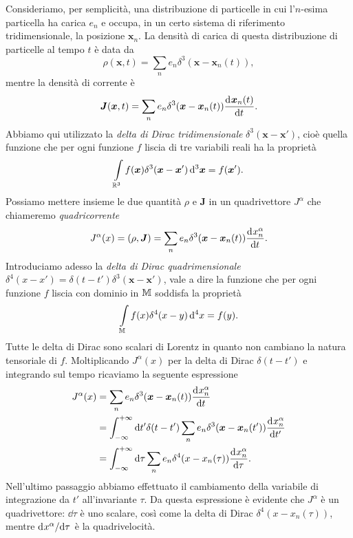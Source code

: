 Consideriamo, per semplicità, una distribuzione di particelle in cui l'$n$-esima
particella ha carica $e_{n}$ e occupa, in un certo sistema di riferimento
tridimensionale, la posizione $\bm{x}_{n}$.  La densità
di carica di questa distribuzione di particelle al tempo $t$ è data da
\begin{equation}
  \rho(\bm{x},t) = \sum_{n} e_{n}\delta^{3}(\bm{x} - \bm{x}_{n}(t)),
\end{equation}
mentre la densità di corrente è
\begin{equation}
  \bm{J}(\bm{x},t) = \sum_{n} e_{n}\delta^{3}(\bm{x} - \bm{x}_{n}(t))
  \frac{{\mathop{}\!\mathrm{d}^{}}\bm{x}_{n}(t)}{\mathop{}\!\mathrm{d} {t}^{}}.
\end{equation}
Abbiamo qui utilizzato la 
\emph{delta di Dirac tridimensionale} $\delta^{3}(\bm{x} - \bm{x}')$, cioè
quella funzione che per ogni funzione $f$ liscia di tre variabili reali ha la
proprietà
\begin{equation}
  \int\limits_{\mathbb{R}^{3}} f(\bm{x})\delta^{3}(\bm{x} - \bm{x}') \mathop{}\!\mathrm{d}^{3} \bm{x} =
  f(\bm{x}').
\end{equation}
Possiamo mettere insieme le due quantità $\rho$ e $\bm{J}$ in un quadrivettore
$J^{\alpha}$ che chiameremo \emph{quadricorrente}
\begin{equation}
  J^{\alpha}(x) = (\rho, \bm{J}) = \sum_{n} e_{n}\delta^{3}(\bm{x} -
  \bm{x}_{n}(t)) \frac{{\mathop{}\!\mathrm{d}^{}}x_{n}^{\alpha}}{\mathop{}\!\mathrm{d} {t}^{}}.
\end{equation}
Introduciamo adesso la 
\emph{delta di Dirac quadrimensionale}
$\delta^{4}(x - x') = \delta(t - t')\delta^{3}(\bm{x} - \bm{x}')$, vale a dire
la funzione che per ogni funzione $f$ liscia con dominio in $\mathbb{M}$ soddisfa la
proprietà
\begin{equation}
  \int\limits_{\mathbb{M}} f(x)\delta^{4}(x - y)\mathop{}\!\mathrm{d}^{4} x = f(y).
\end{equation}
Tutte le delta di Dirac sono scalari di Lorentz in quanto non cambiano la natura
tensoriale di $f$.  Moltiplicando $J^{\alpha}(x)$ per la delta di Dirac
$\delta(t - t')$ e integrando sul tempo ricaviamo la seguente espressione
\begin{equation}
  \label{eq:quadricorrente}
  \begin{split}
    J^{\alpha}(x) &= \sum_{n} e_{n}\delta^{3}(\bm{x} - \bm{x}_{n}(t))
    \toder{x_{n}^{\alpha}}{t} \\
    &= \int_{-\infty}^{+\infty}\dd t' \delta(t - t') \sum_{n}
    e_{n}\delta^{3}(\bm{x} - \bm{x}_{n}(t')) \toder{x_{n}^{\alpha}}{t'} \\
    &= \int_{-\infty}^{+\infty} \dd \tau \sum_{n} e_{n} \delta^{4}(x -
    x_{n}(\tau)) \toder{x_{n}^{\alpha}}{\tau}.
  \end{split}
\end{equation}
Nell'ultimo passaggio abbiamo effettuato il cambiamento della variabile di
integrazione da $t'$ all'invariante $\tau$.  Da questa espressione è evidente
che $J^{\alpha}$ è un quadrivettore: $\dd \tau$ è uno scalare, così come la
delta di Dirac $\delta^{4}(x - x_{n}(\tau))$, mentre $\mathrm{d}^{}x^{\alpha} / \mathrm{d} {\tau}^{}$
è la quadrivelocità.

